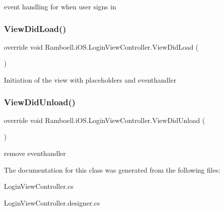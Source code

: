 event handling for when user signs in 

\mbox{\label{class_ramboell_1_1i_o_s_1_1_login_view_controller_a43dbaf2dd54a2a4884ca87d26697f375}} 
\subsubsection{\texorpdfstring{View\+Did\+Load()}{ViewDidLoad()}}
{\footnotesize\ttfamily override void Ramboell.\+i\+O\+S.\+Login\+View\+Controller.\+View\+Did\+Load (\begin{DoxyParamCaption}{ }\end{DoxyParamCaption})}



Initiation of the view with placeholders and eventhandler 

\mbox{\label{class_ramboell_1_1i_o_s_1_1_login_view_controller_ac6f5b00fbb4861aa7e87e21c25e76c55}} 
\subsubsection{\texorpdfstring{View\+Did\+Unload()}{ViewDidUnload()}}
{\footnotesize\ttfamily override void Ramboell.\+i\+O\+S.\+Login\+View\+Controller.\+View\+Did\+Unload (\begin{DoxyParamCaption}{ }\end{DoxyParamCaption})}



remove eventhandler 



The documentation for this class was generated from the following files\+:\begin{DoxyCompactItemize}
\item 
Login\+View\+Controller.\+cs\item 
Login\+View\+Controller.\+designer.\+cs\end{DoxyCompactItemize}
